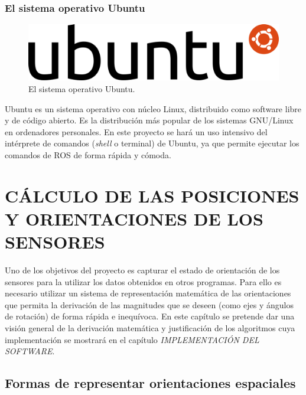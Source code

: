 \documentclass[12pt, a4paper]{report}
\begin{document}
\subsection{El sistema operativo Ubuntu}

\begin{figure}
  \begin{center}
    \includegraphics[scale=0.3]{../img/ubuntu_logo.png} 
  \end{center}
  \caption[El sistema operativo Ubuntu]{El sistema operativo Ubuntu.}
  \label{fig: ubuntu_logo}
\end{figure}

Ubuntu es un sistema operativo con núcleo Linux, distribuido como software libre y de código abierto. Es la distribución más popular de los sistemas GNU/Linux en ordenadores personales. En este proyecto se hará un uso intensivo del intérprete de comandos (\textit{shell} o terminal) de Ubuntu, ya que permite ejecutar los comandos de ROS de forma rápida y cómoda. \\


\chapter{CÁLCULO DE LAS POSICIONES Y ORIENTACIONES DE LOS SENSORES}

Uno de los objetivos del proyecto es capturar el estado de orientación de los sensores para la utilizar los datos obtenidos en otros programas. Para ello es necesario utilizar un sistema de representación matemática de las orientaciones que permita la derivación de las magnitudes que se deseen (como ejes y ángulos de rotación) de forma rápida e inequívoca. En este capítulo se pretende dar una visión general de la derivación matemática y justificación de los algoritmos cuya implementación se mostrará en el capítulo \textit{IMPLEMENTACIÓN DEL SOFTWARE}.

\section{Formas de representar orientaciones espaciales}
\end{document}
